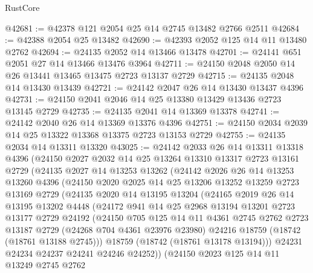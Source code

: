 \begin{lexlean}{RustCore}
\begin{coremodule}
@42681 := @42378 @121 @2054 @25 @14 @2745 @13482 @2766 @2511
@42684 := @42388 @2054 @25 @13482
@42690 := @42393 @2052 @125 @14 @11 @13480 @2762
@42694 := @24135 @2052 @14 @13466 @13478
@42701 := @24141 @651 @2051 @27 @14 @13466 @13476 @3964
@42711 := @24150 @2048 @2050 @14 @26 @13441 @13465 @13475 @2723 @13137 @2729
@42715 := @24135 @2048 @14 @13430 @13439
@42721 := @24142 @2047 @26 @14 @13430 @13437 @4396
@42731 := @24150 @2041 @2046 @14 @25 @13380 @13429 @13436 @2723 @13145 @2729
@42735 := @24135 @2041 @14 @13369 @13378
@42741 := @24142 @2040 @26 @14 @13369 @13376 @4396
@42751 := @24150 @2034 @2039 @14 @25 @13322 @13368 @13375 @2723 @13153 @2729
@42755 := @24135 @2034 @14 @13311 @13320
@43025 := @24142
    @2033
    @26
    @14
    @13311
    @13318
    @4396
    (@24150
      @2027
      @2032
      @14
      @25
      @13264
      @13310
      @13317
      @2723
      @13161
      @2729
      (@24135
        @2027
        @14
        @13253
        @13262
        (@24142
          @2026
          @26
          @14
          @13253
          @13260
          @4396
          (@24150
            @2020
            @2025
            @14
            @25
            @13206
            @13252
            @13259
            @2723
            @13169
            @2729
            (@24135
              @2020
              @14
              @13195
              @13204
              (@24165
                @2019
                @26
                @14
                @13195
                @13202
                @4448
                (@24172
                  @941
                  @14
                  @25
                  @2968
                  @13194
                  @13201
                  @2723
                  @13177
                  @2729
                  @24192
                  (@24150
                    @705
                    @125
                    @14
                    @11
                    @4361
                    @2745
                    @2762
                    @2723
                    @13187
                    @2729
                    (@24268 @704 @4361 @23976 @23980)
                    @24216
                    @18759
                    (@18742 (@18761 @13188 @2745)))
                  @18759
                  (@18742 (@18761 @13178 @13194)))
                @24231
                @24234
                @24237
                @24241
                @24246
                @24252))
            (@24150
              @2023
              @125
              @14
              @11
              @13249
              @2745
              @2762

\end{coremodule}
\end{lexlean}
